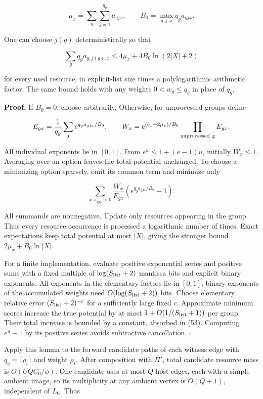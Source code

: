 \[
\mu_x=\sum_g\sum_{j=1}^{q_g}a_{gjx},\qquad
 B_0=\max_{g,j,x}q_g a_{gjx}.
\]

One can choose \(j(g)\) deterministically so that

\[
\sum_g q_g a_{g,j(g),x}
 \leq4\mu_x+4B_0\ln(2|X|+2)
 \tag{53}
\]

for every used resource, in explicit-list size times a polylogarithmic arithmetic factor. The same bound holds with any weights \(0<w_g\leq q_g\) in place of \(q_g\).

\textbf{Proof.} If \(B_0=0\), choose arbitrarily. Otherwise, for unprocessed groups define

\[
E_{gx}=\frac1{q_g}\sum_j e^{q_ga_{gjx}/B_0},\qquad
 W_x=e^{(b_x-2\mu_x)/B_0}\prod_{\rm unprocessed\ g}E_{gx}.
\]

All individual exponents lie in \([0,1]\). From \(e^u\leq1+(e-1)u\), initially \(W_x\leq1\). Averaging over an option leaves the total potential unchanged. To choose a minimizing option sparsely, omit its common term and minimize only

\[
\sum_{x:a_{gjx}>0}\frac{W_x}{E_{gx}}
                                  (e^{q_ga_{gjx}/B_0}-1).
 \tag{54}
\]

All summands are nonnegative. Update only resources appearing in the group. Thus every resource occurrence is processed a logarithmic number of times. Exact expectations keep total potential at most \(|X|\), giving the stronger bound \(2\mu_x+B_0\ln|X|\).

For a finite implementation, evaluate positive exponential series and positive sums with a fixed multiple of \(\log(S_{\rm list}+2)\) mantissa bits and explicit binary exponents. All exponents in the elementary factors lie in \([0,1]\); binary exponents of the accumulated weights need \(O(\log(S_{\rm list}+2))\) bits. Choose elementary relative error \((S_{\rm list}+2)^{-c}\) for a sufficiently large fixed \(c\). Approximate minimum scores increase the true potential by at most \(1+O(1/(S_{\rm list}+1))\) per group. Their total increase is bounded by a constant, absorbed in (53). Computing \(e^u-1\) by its positive series avoids subtractive cancellation. \hfill\(\square\)

Apply this lemma to the forward candidate paths of each witness edge with \(q_g=\lceil\rho_i\rceil\) and weight \(\rho_i\). After composition with \(\Pi'\), total candidate resource mass is \(O(UQC_0/\phi)\). One candidate uses at most \(Q\) host edges, each with a simple ambient image, so its multiplicity at any ambient vertex is \(O(Q+1)\), independent of \(L_0\). Thus


